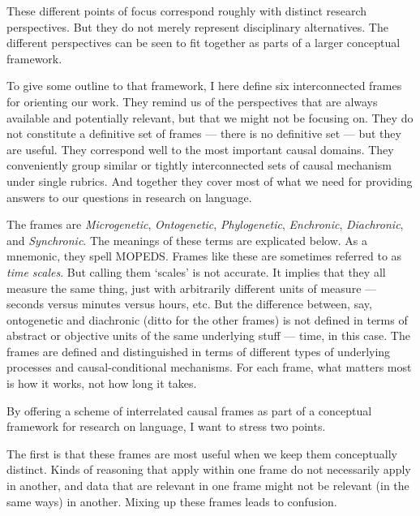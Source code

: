 These different points of focus correspond roughly with distinct research 
perspectives. But they do not merely represent disciplinary 
alternatives. The different perspectives can be seen to 
fit together as parts of a larger conceptual framework. 



To give some outline to that framework, I here define six interconnected frames for orienting our work. They remind us of the 
perspectives that are always available and potentially relevant, but that we might 
not be focusing on. They do not constitute a definitive set of 
frames --- there is no definitive set --- but they are useful. They correspond 
well to the most important causal domains. They conveniently group 
similar or tightly interconnected sets of causal mechanism under single 
rubrics. And together they cover most of what we need for providing 
answers to our questions in research on language. 


The frames are \textit{Microgenetic}, \textit{Ontogenetic}, 
\textit{Phylogenetic}, \textit{Enchronic}, \textit{Diachronic}, 
and \textit{Synchronic}. The meanings of these terms are explicated below. As a mnemonic, they spell MOPEDS. Frames like these are sometimes referred to as \textit{time scales}. But calling them `scales' is not accurate. It implies that they all measure the same thing, just with arbitrarily different units of measure --- seconds versus minutes versus hours, etc. But the difference between, say, ontogenetic and diachronic (ditto for the other frames) is not defined in terms of abstract or objective units of the same underlying stuff --- time, in this case. The frames are defined and distinguished in 
terms of different types of underlying processes and 
causal-conditional mechanisms. For each frame, what 
matters most is how it works, not how long it takes. 



By offering a scheme of interrelated causal frames as part of a conceptual 
framework for research on language, I want to stress two points. 



The first is that these frames are most useful when we keep them 
conceptually distinct. Kinds of reasoning that apply within one frame do 
not necessarily apply in another, and data that are relevant in one 
frame might not be relevant (in the same ways) in another. Mixing up these frames leads to confusion. 



